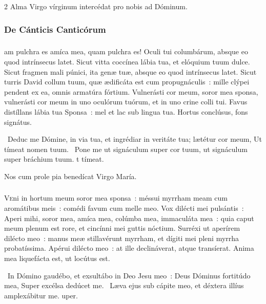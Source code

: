 \documentclass[9pt,twoside]{extarticle}
\begin{document}
\begin{multicols}{2}
\smallskip
{\small {} Alma Virgo vírginum intercédat pro nobis ad Dóminum.}

\subsubsection*{\center \normalfont De Cánticis Canticórum}
\subsubsection*{\center \normalfont {}}
am pulchra es amíca mea, quam pulchra es! Oculi tui columbárum, absque eo quod intrínsecus latet. 
Sicut vitta coccínea lábia tua, et elóquium tuum dulce. Sicut fragmen mali púnici, ita genæ tuæ, absque eo quod intrínsecus latet.
Sicut turris David collum tuum, quæ ædificáta est cum propugnáculis~: mille clýpei pendent ex ea, omnis armatúra fórtium.
Vulnerásti cor meum, soror mea sponsa, vulnerásti cor meum in uno oculórum tuórum, et in uno crine colli tui.
Favus distíllans lábia tua Sponsa~: mel et lac sub lingua tua.
Hortus conclúsus, fons signátus.

~Deduc me Dómine, in via tua, et ingrédiar in veritáte tua; lætétur cor meum, \textred{*} Ut tímeat nomen tuum. ~Pone me ut signáculum super cor tuum, ut signáculum super bráchium tuum. t tímeat.

\smallskip
{\small {} Nos cum prole pia benedícat Virgo María.}

\subsubsection*{\center \normalfont {}}
\lettrine{V}{e}ni in hortum meum soror mea sponsa~: méssui myrrham meam cum aromátibus meis~: comédi favum cum melle meo.
Vox dilécti mei pulsántis~: Aperi mihi, soror mea, amíca mea, colúmba mea, immaculáta mea~: quia caput meum plenum est rore, et cincínni mei guttis nóctium.
Surréxi ut aperírem dilécto meo~: manus meæ stillavérunt myrrham, et dígiti mei pleni myrrha probatíssima.
Apérui dilécto meo~: at ille declináverat, atque transíerat. Anima mea liquefácta est, ut locútus est.

~In Dómino gaudébo, et exsultábo in Deo Jesu meo~: Deus Dóminus fortitúdo mea, \textred{*} Super excélsa dedúcet me. ~Læva ejus sub cápite meo, et déxtera illíus amplexábitur me. uper.


\end{multicols}
\end{document}
